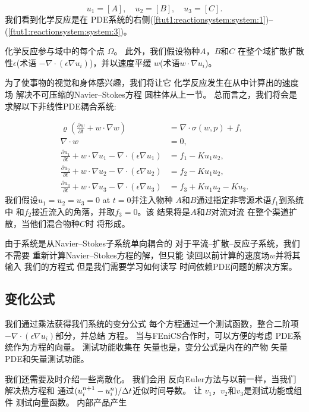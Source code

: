 \[
  u_1 = [A], \quad u_2 = [B], \quad u_3 = [C].
\]
我们看到化学反应是在
PDE系统的右侧(\ref{ftut1:reactionsystem:system:1})--(\ref{ftut1:reactionsystem:system:3})。

化学反应参与域中的每个点
$\Omega$。 此外，我们假设物种$A$，$B$和$C$
在整个域扩散扩散性$\epsilon$(术语
$-\nabla\cdot(\epsilon\nabla u_i)$)，并以速度平缓
$w$(术语$w\cdot\nabla u_i$)。

为了使事物的视觉和身体感兴趣，我们将让它
化学反应发生在从中计算出的速度场
解决不可压缩的Navier--Stokes方程
圆柱体从上一节。 总而言之，我们将会是
求解以下非线性PDE耦合系统:

\begin{align}
  \label{ftut1:reactionsystem:full}
  \varrho\left(\frac{\partial w}{\partial t} +
  w \cdot \nabla w\right) &= \nabla\cdot\sigma(w, p) + f, \\
  \nabla \cdot w &= 0, \\
  \frac{\partial u_1}{\partial t} +
  w \cdot \nabla u_1 - \nabla\cdot(\epsilon\nabla u_1)
    &= f_1 - K u_1 u_2, \\
  \frac{\partial u_2}{\partial t} +
  w \cdot \nabla u_2 - \nabla\cdot(\epsilon\nabla u_2)
    &= f_2 - K u_1 u_2, \\
  \frac{\partial u_3}{\partial t} +
  w \cdot \nabla u_3 - \nabla\cdot(\epsilon\nabla u_3)
    &= f_3 + K u_1 u_2 - K u_3.
\end{align}
我们假设$u_1 = u_2 = u_3 = 0$ at $t = 0$并注入物种
$A$和$B$通过指定非零源术语$f_1$到系统中
和$f_2$接近流入的角落，并取$f_3 = 0$。该
结果将是$A$和$B$对流对流
在整个渠道扩散，当他们混合物种$C$时
将形成。

由于系统是从Navier--Stokes子系统单向耦合的
对于平流--扩散--反应子系统，我们不需要
重新计算Navier--Stokes方程的解，但只能
读回以前计算的速度场$w$并将其输入
我们的方程式 但是我们需要学习如何读写
时间依赖PDE问题的解决方案。

\subsection{变化公式}

我们通过乘法获得我们系统的变分公式
每个方程通过一个测试函数，整合二阶项
$-\nabla\cdot(\epsilon\nabla u_i)$部分，并总结
方程。 当与FEniCS合作时，可以方便的考虑
PDE系统作为方程的向量。 测试功能收集在
矢量也是，变分公式是内在的产物
矢量PDE和矢量测试功能。

我们还需要及时介绍一些离散化。 我们会用
反向Euler方法与以前一样，当我们解决热方程和
通过$(u_i^{n+1}-u_i^n) / \dt$近似时间导数。 让
$v_1$，$v_2$和$v_3$是测试功能或组件
测试向量函数。 内部产品产生

